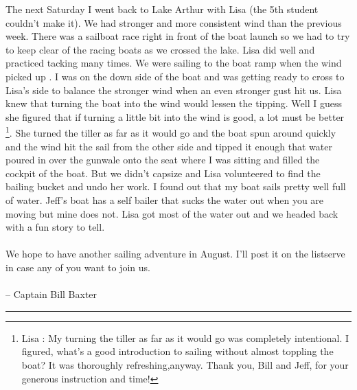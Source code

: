 \documentclass[10pt,a4paper]{article}
\begin{document}
\begin{multicols}{2}
The next Saturday I went back to Lake Arthur with Lisa (the 5th student couldn't make it).  We had stronger and more consistent wind than the previous week.  There was a sailboat race right in front of the boat launch so we had to try to keep clear of the racing boats as we crossed the lake.  Lisa did well and practiced tacking many times.  We were sailing to the boat ramp when the wind picked up .  I was on the down side of the boat and was getting ready to cross to Lisa's side to balance the stronger wind when an even stronger gust hit us.  Lisa knew that turning the boat into the wind would lessen the tipping.  Well I guess she figured that if turning a little bit into the wind is good, a lot must be better \footnote{Lisa : My turning the tiller as far as it would go was completely intentional. I figured, what's a good introduction to sailing without almost toppling the boat? It was thoroughly refreshing,anyway. Thank you, Bill and Jeff, for your generous instruction and time!}.  She turned the tiller as far as it would go and the boat spun around quickly and the wind hit the sail from the other side and tipped it enough that water poured in over the gunwale onto the seat where I was sitting and filled the cockpit of the boat.  But we didn't capsize and Lisa volunteered to find the bailing bucket and undo her work.  I found out that my boat sails pretty well full of water.  Jeff's boat has a self bailer that sucks the water out when you are moving but mine does not.   Lisa got most of the water out and we headed back with a fun story to tell.
\\
\\
We hope to have another sailing adventure in August.  I'll post it on the listserve in case any of you want to join us.
\\
\\
-- Captain Bill Baxter

\hrule


\end{multicols}
\end{document}
